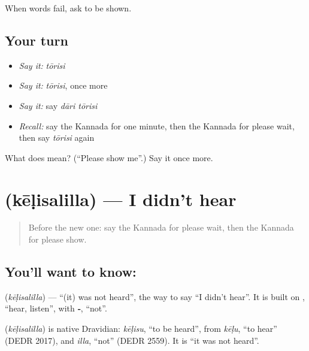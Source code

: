 \begin{grammarlens}[title={What you've built}]
When words fail, ask to be shown.
\end{grammarlens}

\subsection*{Your turn}
\begin{itemize}
\raggedright
  \item \emph{Say it:} \emph{tōrisi}
  \item \emph{Say it:} \emph{tōrisi}, once more
  \item \emph{Say it:} say \emph{dāri tōrisi}
  \item \emph{Recall:} say the Kannada for one minute, then the Kannada for please wait, then say \emph{tōrisi} again
\end{itemize}

\begin{tcolorbox}[breakable,colback=teal!4,colframe=teal!35!black,title={Before you move on}]
What does  mean? (\textquotedblleft{}Please show me\textquotedblright{}.) Say it once more.
\end{tcolorbox}
\section[\texorpdfstring{\kn{ಕೇಳಿಸಲಿಲ್ಲ} (kēḷisalilla)}{ಕೇಳಿಸಲಿಲ್ಲ (kēḷisalilla)}]{ (kēḷisalilla) — I didn't hear}

\label{lesson:KA-C86-didnthear}



\begin{quote}
Before the new one: say the Kannada for please wait, then the Kannada for please show.
\end{quote}

\subsection*{You'll want to know: }
\textbf{} (\emph{kēḷisalilla}) — \textquotedblleft{}(it) was not heard\textquotedblright{}, the way to say \textquotedblleft{}I didn't hear\textquotedblright{}. It is built on \textbf{}, \textquotedblleft{}hear, listen\textquotedblright{}, with \textbf{‑}, \textquotedblleft{}not\textquotedblright{}.

\begin{cousinweb}
\textbf{} (\emph{kēḷisalilla}) is native Dravidian: \emph{kēḷisu}, \textquotedblleft{}to be heard\textquotedblright{}, from \emph{kēḷu}, \textquotedblleft{}to hear\textquotedblright{} (DEDR 2017), and \emph{illa}, \textquotedblleft{}not\textquotedblright{} (DEDR 2559). It is \textquotedblleft{}it was not heard\textquotedblright{}.
\end{cousinweb}

